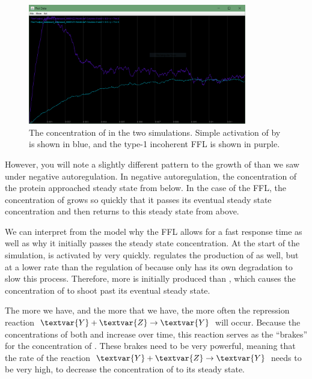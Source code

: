\begin{figure}[h]
\centering
\mySfFamily
\includegraphics[width = 0.85\textwidth]{../images/ffl_chart.png}
\caption{The concentration of  in the two simulations. Simple activation of  by  is shown in blue, and the type-1 incoherent FFL is shown in purple.}
\label{fig:ffl_chart}
\end{figure}

However, you will note a slightly different pattern to the growth of  than we saw under negative autoregulation. In negative autoregulation, the concentration of the protein approached steady state from below. In the case of the FFL, the concentration of  grows so quickly that it passes its eventual steady state concentration and then returns to this steady state from above.

We can interpret from the model why the FFL allows for a fast response time as well as why it initially passes the steady state concentration. At the start of the simulation,  is activated by  very quickly.  regulates the production of  as well, but at a lower rate than the regulation of  because  only has its own degradation to slow this process. Therefore, more  is initially produced than , which causes the concentration of  to shoot past its eventual steady state.

The more  we have, and the more  that we have, the more often the repression reaction $\textvar{Y} + \textvar{Z} \rightarrow \textvar{Y}$ will occur. Because the concentrations of both  and  increase over time, this reaction serves as the ``brakes'' for the concentration of . These brakes need to be very powerful, meaning that the rate of the reaction $\textvar{Y} + \textvar{Z} \rightarrow \textvar{Y}$ needs to be very high, to decrease the concentration of  to its steady state.

